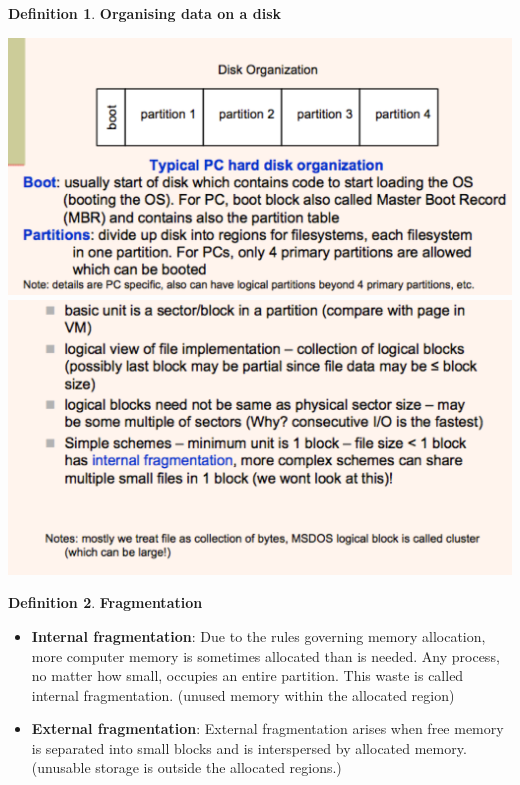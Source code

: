 \documentclass[11pt,a4paper]{article}
\theoremstyle{definition}
\newtheorem{definition}{Definition}[section]
\newenvironment{myitemize}
{ \begin{itemize}
    \setlength{\itemsep}{5pt}
    \setlength{\parskip}{0pt}
    \setlength{\parsep}{0pt}     }
{ \end{itemize}                  }
\begin{document}
\begin{definition}{\textbf{Organising data on a disk}}

	\includegraphics[width=0.48\linewidth]{m2/diskOrgnization1}
	\includegraphics[width=0.48\linewidth]{m2/diskOrgnization2}
\end{definition}

\begin{definition}{\textbf{Fragmentation}}
	\begin{myitemize}
		\item \textbf{Internal fragmentation}: Due to the rules governing memory allocation, more computer memory is sometimes allocated than is needed. Any process, no matter how small, occupies an entire partition. This waste is called internal fragmentation. (unused memory within the allocated region)
		\item \textbf{External fragmentation}: External fragmentation arises when free memory is separated into small blocks and is interspersed by allocated memory. (unusable storage is outside the allocated regions.)
	\end{myitemize}
\end{definition}
	
\end{document}
